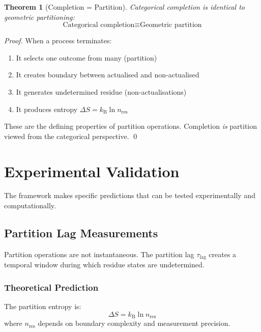 \documentclass[twocolumn,10pt]{article}
\newtheorem{theorem}{Theorem}[section]
\theoremstyle{definition}
\theoremstyle{remark}
\newcommand{\kB}{k_{\mathrm{B}}}
\begin{document}
\begin{theorem}[Completion = Partition]
\label{thm:completion}
Categorical completion is identical to geometric partitioning:
\begin{equation}
\text{Categorical completion} \equiv \text{Geometric partition}
\end{equation}
\end{theorem}

\begin{proof}
When a process terminates:
\begin{enumerate}
\item It selects one outcome from many (partition)
\item It creates boundary between actualised and non-actualised
\item It generates undetermined residue (non-actualisations)
\item It produces entropy $\Delta S = \kB \ln n_{\text{res}}$
\end{enumerate}

These are the defining properties of partition operations. Completion \textit{is} partition viewed from the categorical perspective. \qed
\end{proof}

\section{Experimental Validation}
\label{sec:experimental}

The framework makes specific predictions that can be tested experimentally and computationally.

\subsection{Partition Lag Measurements}

Partition operations are not instantaneous. The partition lag $\tau_{\text{lag}}$ creates a temporal window during which residue states are undetermined.

\subsubsection{Theoretical Prediction}

The partition entropy is:
\begin{equation}
\Delta S = \kB \ln n_{\text{res}}
\end{equation}
where $n_{\text{res}}$ depends on boundary complexity and measurement precision.
\end{document}
